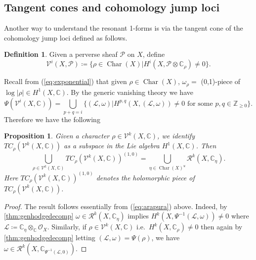 \documentclass[12pt,reqno]{amsart}
\newtheorem{proposition}[theorem]{Proposition}
\theoremstyle{question}
\theoremstyle{definition}
\newtheorem{definition}[theorem]{Definition}
\theoremstyle{remark}
\theoremstyle{cited}
\theoremstyle{citeddef}
\DeclareMathOperator{\Char}{Char}
\def\Pic{{\rm Pic}}
\newcommand{\sL}{\mathcal{L}}
\newcommand{\sM}{\mathcal{M}}
\newcommand{\sO}{\mathcal{O}}
\newcommand{\sP}{\mathcal{P}}
\newcommand{\sR}{\mathcal{R}}
\newcommand\sV{{\mathcal V}}
\newcommand{\bbC}{\mathbb{C}}
\newcommand{\bbZ}{\mathbb{Z}}
\begin{document}
\subsection{Tangent cones and cohomology jump loci}
\label{sub:tc} Another way to understand the resonant 1-forms is via the tangent cone of the cohomology jump loci defined
as follows.
\begin{definition}
Given a perverse sheaf $\sP$ on $X$, define
\[\sV^i(X,\sP) \coloneqq \{\rho\in\Char(X)|
H^i(X,\sP\otimes \bbC_{\rho})\neq 0\}.\]
\end{definition}
Recall from (\ref{eq:exponential}) that given $\rho\in \Char(X)$, $\omega_{\rho} = $ (0,1)-piece of $\log|\rho|\in H^1(X, \bbC)$. 
By the generic vanishing theory \cite[Theorem 3]{Ara92} we have 
\begin{equation}
\Psi(\sV^i(X,\bbC))
=\bigcup_{p+q = i}\{(\sL,\omega)| H^{p,q}(X,(\sL,\omega)) \neq 0
 \text{ for some } p,q\in\bbZ_{\geq 0}\}.
\label{eq:arapura}
\end{equation}
Therefore we have the following
\begin{proposition} 
Given a character $\rho\in \sV^k(X,\bbC)$,
we identify $TC_{\rho}(\sV^k(X,\bbC))$ as a subspace in the
 Lie algebra
$H^1(X,\bbC)$. Then
\[\bigcup_{\rho\in\sV^k(X,\bbC)}TC_{\rho}(\sV^k(X,\bbC))^{(1,0)} = \bigcup_{\eta\in \Char(X)^{u}}\sR^k(X, \bbC_\eta).\]
Here $TC_{\rho}(\sV^k(X,\bbC))^{(1,0)}$ denotes the holomorphic
piece of $TC_{\rho}(\sV^k(X,\bbC))$.
\label{prop:equivalence}
\end{proposition}
\begin{proof}
The result follows essentially from (\ref{eq:arapura})
above. Indeed, by \ref{thm:genhodgedecomp} $\omega \in \sR^k(X, \bbC_{\eta})$
implies $H^k(X, \Psi^{-1}(\sL, \omega)) \neq 0$
where $\sL\coloneqq \bbC_{\eta}\otimes_{\bbC}\sO_X$.
Similarly, if $\rho\in \sV^k(X, \bbC)$ i.e.\ $H^k(X, \bbC_{\rho})
\neq 0$ then again by \ref{thm:genhodgedecomp} letting
$(\sL, \omega) = \Psi(\rho)$,
we have $\omega\in \sR^k(X, \bbC_{\Psi^{-1}(\sL, 0)})$.

\end{proof}
\end{document}
